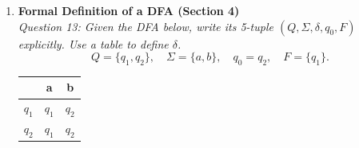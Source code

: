 \documentclass[10pt,letterpaper,unboxed,cm]{article}
\begin{document}
\begin{enumerate}
\pagebreak

\item \textbf{Formal Definition of a DFA (Section 4)} \\
\emph{Question 13: Given the DFA below, write its 5-tuple $(Q, \Sigma, \delta, q_0, F)$ explicitly. Use a table to define $\delta$.} \\

\[
Q = \{q_1, q_2\}, \quad \Sigma = \{a,b\}, \quad q_0 = q_2, \quad F = \{q_1\}.
\]

\begin{center}
\begin{tabular}{||c||c c||}
\hline
 & a & b \\
\hline\hline
$q_1$ & $q_1$ & $q_2$ \\
\hline
$q_2$ & $q_1$ & $q_2$ \\
\hline
\end{tabular}
\end{center}

\end{enumerate}
\end{document}
